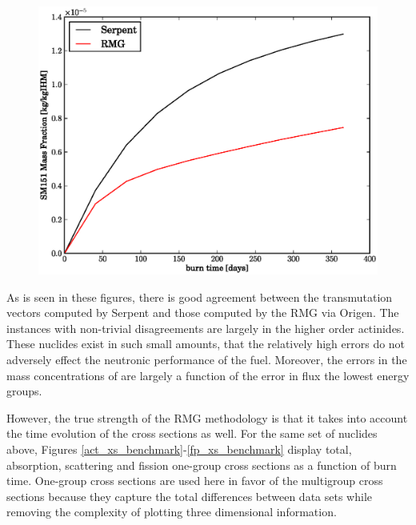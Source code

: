 \begin{figure}[htbp]
\begin{center}
\includegraphics[scale=0.3]{multigroup_method/figs/benchmark/SM151_Mass_Fraction_.eps}
\end{center}
\end{figure}


As is seen in these figures, there is good agreement between the transmutation vectors computed by
Serpent and those computed by the RMG via Origen.  The instances with non-trivial disagreements are 
largely in the higher order actinides.  These nuclides exist in such small amounts, that the relatively
high errors do not adversely effect the neutronic performance of the fuel.   Moreover, the errors in the
mass concentrations of are largely a function of the error in flux the lowest energy groups.  


However, the true strength of the RMG methodology is 
that it takes into account the time evolution of the cross sections as well.  For the same set 
of nuclides above, Figures \ref{act_xs_benchmark}-\ref{fp_xs_benchmark} display total, absorption,
scattering and fission one-group cross sections as a function of burn time.  One-group cross sections 
are used here in favor of the multigroup cross sections because they capture the total differences 
between data sets while removing the complexity of plotting three dimensional information.

